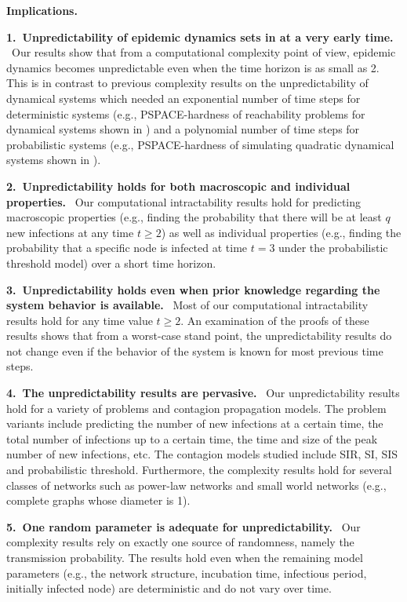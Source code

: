 \medskip

\noindent
\textbf{Implications.}

\medskip\smallskip

\noindent
\textbf{1.~Unpredictability of epidemic dynamics sets in at a very early time.} \ 
Our results show that from a computational complexity point of view, 
epidemic dynamics becomes unpredictable even when the 
time horizon is as small as 2.
This is in contrast to previous complexity results on the unpredictability
of dynamical systems which needed an exponential number of time steps for
deterministic systems (e.g., PSPACE-hardness of reachability problems
for dynamical systems shown in \cite{BH+06}) and a polynomial number of time
steps for probabilistic systems (e.g., PSPACE-hardness of simulating 
quadratic dynamical systems shown in \cite{Arora-etal-1994}).

\medskip
\noindent
\textbf{2.~Unpredictability holds for both macroscopic and individual properties.} \ 
Our computational intractability results hold for predicting 
macroscopic properties (e.g., finding the probability that there will be at least
$q$ new infections at any time $t \geq 2$) as well as individual properties
(e.g., finding the probability that a specific node is infected at time $t = 3$
under the probabilistic threshold model) over a short time horizon.

\medskip
\noindent
\textbf{3.~Unpredictability holds even when prior knowledge regarding
the system behavior is available.} \ 
Most of our computational intractability results hold for any time value $t \geq 2$.
An examination of the proofs of these results shows that
from a worst-case stand point, the unpredictability results do not change
even if the behavior of the system is known for most previous time steps. 

\medskip
\noindent
\textbf{4.~The unpredictability results are pervasive.} \
Our unpredictability results hold for a variety of problems 
and contagion propagation models. 
The problem variants include predicting the number of new infections
at a certain time, the total number of infections up to a certain time,
the time and size of the peak number of new infections, etc.
The contagion models studied include SIR, SI, SIS and probabilistic
threshold. 
Furthermore, the complexity results hold for
several classes of networks such as power-law networks and small world
networks (e.g., complete graphs whose diameter is 1).

\medskip
\noindent
\textbf{5.~One random parameter is adequate for unpredictability.} \ 
Our complexity results rely on exactly one source of randomness, namely
the transmission probability. 
The results hold even when the remaining model parameters 
(e.g., the network structure, 
incubation time, infectious period, initially infected node)
are deterministic and do not vary over time.  

